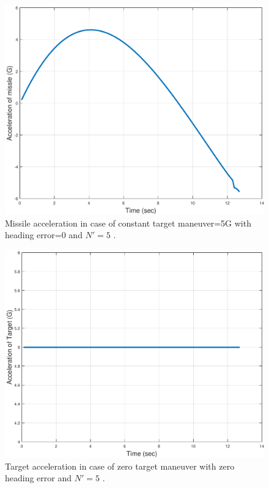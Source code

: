 \begin{figure}[htb]
	\centering
	\includegraphics[scale = 0.35]{fig/MissileAccelerationXNT5HE0N5.pdf}
	\caption{Missile acceleration in case of constant target maneuver=5G with heading error=0 and $N'=5$ .}
	\label{missile acceleration0NN5}
\end{figure}


\begin{figure}[H]
	\centering
	\includegraphics[scale = 0.35]{fig/TargetAccelerationXNT5HE0N5.pdf}
	\caption{Target acceleration in case of zero target maneuver with zero heading error and $N'=5$ .}
	\label{Target accelerationXNT5HE0N5}
\end{figure}

